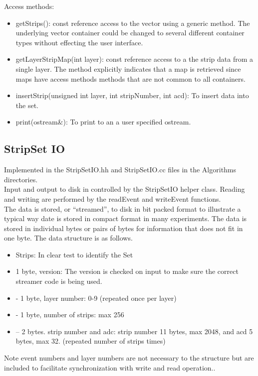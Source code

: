 \documentclass[aps,prd,superscriptaddress,floatfix]{revtex4}
\begin{document}
Access methods:
\begin{itemize}
\item getStrips(): const reference access to the vector using a generic method. The underlying vector container could be 
changed to several different container types without effecting the user interface.
\item getLayerStripMap(int layer): const reference access to a the strip data from a single layer. The method explicitly 
indicates that a map is retrieved since maps have access methods methods that are not common to all containers.
\item insertStrip(unsigned int layer, int stripNumber, int acd):  To insert data into the set.
\item print(ostream\&): To print to an a user specified ostream.
\end{itemize}

\subsection{StripSet IO}
Implemented in the StripSetIO.hh and StripSetIO.cc files in the Algorithms directories.
\\

Input and output to disk in controlled by the StripSetIO helper class.  Reading and writing
are performed by the readEvent and writeEvent functions.
\\

The data is stored, or ``streamed'', to disk in bit packed format to illustrate a typical way date is stored in compact
format in many experiments.  The data is stored in individual bytes or pairs of bytes for information
that does not fit in one byte.  The data structure is as follows.
\begin{itemize}
\item Strips: In clear test to identify the Set
\item  1 byte, version: The version is checked on input to make sure the correct streamer code is being used.
\item - 1 byte, layer number: 0-9 (repeated once per layer)
\item - 1 byte, number of strips: max 256
\item -- 2 bytes. strip number and adc: strip number 11 bytes, max 2048, and acd 5 bytes, max 32. (repeated number of strips times)
\end{itemize}

Note event numbers and layer numbers are not necessary to the
structure but are included to facilitate synchronization with write and read operation..
\\
\end{document}
